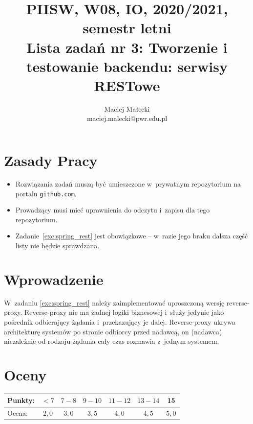 \documentclass[12pt]{article}
\title{PIISW, W08, IO, 2020/2021, semestr letni\\Lista zadań nr 3: Tworzenie i testowanie backendu: serwisy RESTowe}
\author{Maciej Małecki\\ \small maciej.malecki@pwr.edu.pl}
\begin{document}
    \maketitle

    \section*{Zasady Pracy}
    \begin{itemize}
        \item Rozwiązania zadań muszą być umieszczone w~prywatnym repozytorium na portalu \texttt{github.com}.
        \item Prowadzący musi mieć uprawnienia do odczytu i~zapisu dla tego repozytorium.
        \item Zadanie~\ref{exc:spring_rest} jest obowiązkowe -- w~razie jego braku dalsza część listy nie będzie sprawdzana.
    \end{itemize}

    \section*{Wprowadzenie}
        W~zadaniu \ref{exc:spring_rest} należy zaimplementować uproszczoną wersję reverse-proxy.
        Reverse-proxy nie ma żadnej logiki biznesowej i~służy jedynie jako pośrednik odbierający żądania i~przekazujący je dalej.
        Reverse-proxy ukrywa architekturę systemów po stronie odbiorcy przed nadawcą, on (nadawca) niezależnie od rodzaju żądania cały czas rozmawia z~jednym systemem.

    \section*{Oceny}
    \begin{tabular}{|l|c|c|c|c|c|c|}
        \hline
        Punkty: & $<7$ & $7-8$ & $9-10$ & $11-12$ & $13-14$ & 15\\
        \hline
        Ocena: & $2,0$ & $3,0$ & $3,5$ & $4,0$ & $4,5$ & $5,0$\\
        \hline
    \end{tabular}
\end{document}
